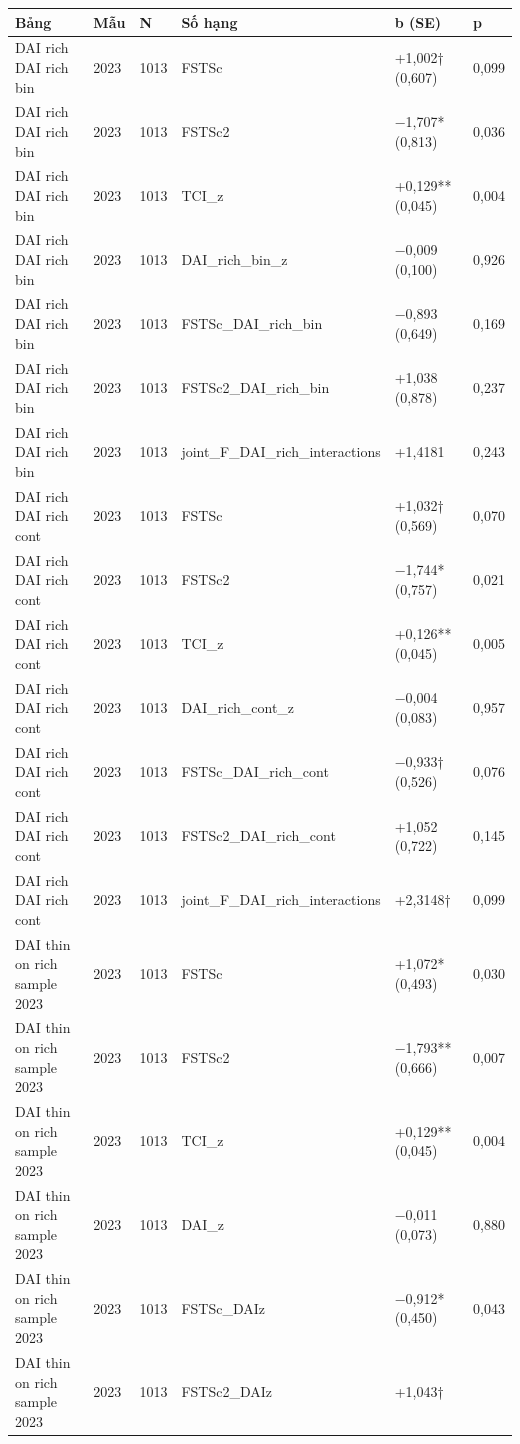 \documentclass[12pt,a4paper]{article}
\begin{document}
\begin{longtable}[]{@{}llllll@{}}
\toprule\noalign{}
Bảng & Mẫu & N & Số hạng & b (SE) & p \\
\midrule\noalign{}
\endhead
\bottomrule\noalign{}
\endlastfoot
DAI rich DAI rich bin & 2023 & 1013 & FSTSc & +1,002† (0,607) & 0,099 \\
DAI rich DAI rich bin & 2023 & 1013 & FSTSc2 & −1,707* (0,813) &
0,036 \\
DAI rich DAI rich bin & 2023 & 1013 & TCI\_z & +0,129** (0,045) &
0,004 \\
DAI rich DAI rich bin & 2023 & 1013 & DAI\_rich\_bin\_z & −0,009 (0,100)
& 0,926 \\
DAI rich DAI rich bin & 2023 & 1013 & FSTSc\_DAI\_rich\_bin & −0,893
(0,649) & 0,169 \\
DAI rich DAI rich bin & 2023 & 1013 & FSTSc2\_DAI\_rich\_bin & +1,038
(0,878) & 0,237 \\
DAI rich DAI rich bin & 2023 & 1013 & joint\_F\_DAI\_rich\_interactions
& +1,4181 & 0,243 \\
DAI rich DAI rich cont & 2023 & 1013 & FSTSc & +1,032† (0,569) &
0,070 \\
DAI rich DAI rich cont & 2023 & 1013 & FSTSc2 & −1,744* (0,757) &
0,021 \\
DAI rich DAI rich cont & 2023 & 1013 & TCI\_z & +0,126** (0,045) &
0,005 \\
DAI rich DAI rich cont & 2023 & 1013 & DAI\_rich\_cont\_z & −0,004
(0,083) & 0,957 \\
DAI rich DAI rich cont & 2023 & 1013 & FSTSc\_DAI\_rich\_cont & −0,933†
(0,526) & 0,076 \\
DAI rich DAI rich cont & 2023 & 1013 & FSTSc2\_DAI\_rich\_cont & +1,052
(0,722) & 0,145 \\
DAI rich DAI rich cont & 2023 & 1013 & joint\_F\_DAI\_rich\_interactions
& +2,3148† & 0,099 \\
DAI thin on rich sample 2023 & 2023 & 1013 & FSTSc & +1,072* (0,493) &
0,030 \\
DAI thin on rich sample 2023 & 2023 & 1013 & FSTSc2 & −1,793** (0,666) &
0,007 \\
DAI thin on rich sample 2023 & 2023 & 1013 & TCI\_z & +0,129** (0,045) &
0,004 \\
DAI thin on rich sample 2023 & 2023 & 1013 & DAI\_z & −0,011 (0,073) &
0,880 \\
DAI thin on rich sample 2023 & 2023 & 1013 & FSTSc\_DAIz & −0,912*
(0,450) & 0,043 \\
DAI thin on rich sample 2023 & 2023 & 1013 & FSTSc2\_DAIz & +1,043†

\end{longtable}
\end{document}

